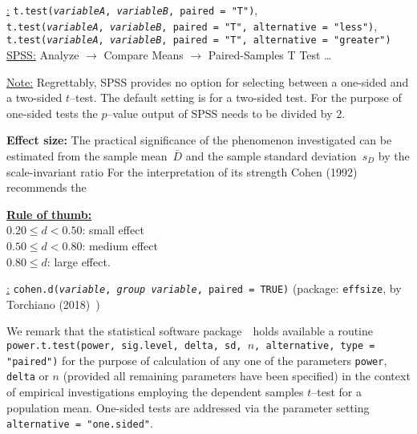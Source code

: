 \medskip
\noindent
\underline{\R:}
\texttt{t.test(\textit{variableA}, \textit{variableB}, 
paired = "T")}, \\
\texttt{t.test(\textit{variableA}, \textit{variableB},
paired = "T", alternative = "less")}, \\
\texttt{t.test(\textit{variableA}, \textit{variableB},
paired = "T", alternative = "greater")} \\
\underline{SPSS:} Analyze $\rightarrow$ Compare Means
$\rightarrow$ Paired-Samples T Test \ldots

\medskip
\noindent
\underline{Note:} Regrettably, SPSS provides no option for 
selecting between a one-sided and a two-sided $t$--test. The 
default setting is for a two-sided test. For the purpose of 
one-sided tests the $p$--value output of SPSS needs to be divided 
by $2$.

\medskip
\noindent
\textbf{Effect size:} The practical significance of the phenomenon investigated can be estimated from the sample mean~$\bar{D}$ and
the sample standard deviation~$s_{D}$ by the scale-invariant ratio
%
\be
{}
\ee
%
For the interpretation of its strength Cohen 
(1992)~ recommends the

\medskip
\noindent
\underline{\textbf{Rule of thumb:}}\\
$0.20 \leq d < 0.50$: small effect\\
$0.50 \leq d < 0.80$: medium effect\\
$0.80 \leq d$: large effect.

\medskip
\noindent
\underline{\R:}
\texttt{cohen.d(\textit{variable}, \textit{group
variable}, paired = TRUE)} (package: \texttt{effsize}, by
Torchiano (2018)~)

\medskip
\noindent
We remark that the statistical software package~\R\ holds 
available a routine \texttt{power.t.test(power, sig.level, delta,
sd, $n$, alternative, type = "paired")} for the purpose of
calculation of any one of the parameters \texttt{power},
\texttt{delta} or $n$ (provided all remaining parameters have been
specified) in the context of empirical investigations employing the
dependent samples $t$--test for a population mean. One-sided tests
are addressed via the parameter setting
\texttt{alternative = "one.sided"}.

